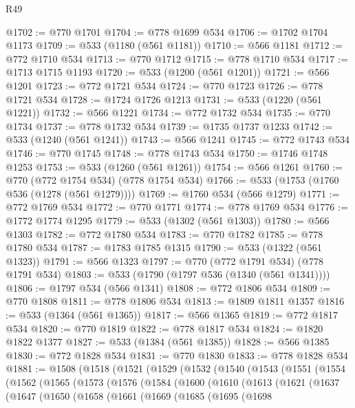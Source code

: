 \begin{lexlean}{R49}
\begin{coremodule}
@1702 := @770 @1701
@1704 := @778 @1699 @534
@1706 := @1702 @1704 @1173
@1709 := @533 (@1180 (@561 @1181))
@1710 := @566 @1181
@1712 := @772 @1710 @534
@1713 := @770 @1712
@1715 := @778 @1710 @534
@1717 := @1713 @1715 @1193
@1720 := @533 (@1200 (@561 @1201))
@1721 := @566 @1201
@1723 := @772 @1721 @534
@1724 := @770 @1723
@1726 := @778 @1721 @534
@1728 := @1724 @1726 @1213
@1731 := @533 (@1220 (@561 @1221))
@1732 := @566 @1221
@1734 := @772 @1732 @534
@1735 := @770 @1734
@1737 := @778 @1732 @534
@1739 := @1735 @1737 @1233
@1742 := @533 (@1240 (@561 @1241))
@1743 := @566 @1241
@1745 := @772 @1743 @534
@1746 := @770 @1745
@1748 := @778 @1743 @534
@1750 := @1746 @1748 @1253
@1753 := @533 (@1260 (@561 @1261))
@1754 := @566 @1261
@1760 := @770 (@772 @1754 @534) (@778 @1754 @534)
@1766 := @533 (@1753 (@1760 @536 (@1278 (@561 @1279))))
@1769 := @1760 @534 (@566 @1279)
@1771 := @772 @1769 @534
@1772 := @770 @1771
@1774 := @778 @1769 @534
@1776 := @1772 @1774 @1295
@1779 := @533 (@1302 (@561 @1303))
@1780 := @566 @1303
@1782 := @772 @1780 @534
@1783 := @770 @1782
@1785 := @778 @1780 @534
@1787 := @1783 @1785 @1315
@1790 := @533 (@1322 (@561 @1323))
@1791 := @566 @1323
@1797 := @770 (@772 @1791 @534) (@778 @1791 @534)
@1803 := @533 (@1790 (@1797 @536 (@1340 (@561 @1341))))
@1806 := @1797 @534 (@566 @1341)
@1808 := @772 @1806 @534
@1809 := @770 @1808
@1811 := @778 @1806 @534
@1813 := @1809 @1811 @1357
@1816 := @533 (@1364 (@561 @1365))
@1817 := @566 @1365
@1819 := @772 @1817 @534
@1820 := @770 @1819
@1822 := @778 @1817 @534
@1824 := @1820 @1822 @1377
@1827 := @533 (@1384 (@561 @1385))
@1828 := @566 @1385
@1830 := @772 @1828 @534
@1831 := @770 @1830
@1833 := @778 @1828 @534
@1881 := @1508
    (@1518
      (@1521
        (@1529
          (@1532
            (@1540
              (@1543
                (@1551
                  (@1554
                    (@1562
                      (@1565
                        (@1573
                          (@1576
                            (@1584
                              (@1600
                                (@1610
                                  (@1613
                                    (@1621
                                      (@1637
                                        (@1647
                                          (@1650
                                            (@1658
                                              (@1661
                                                (@1669
                                                  (@1685
                                                    (@1695
                                                      (@1698

\end{coremodule}
\end{lexlean}
